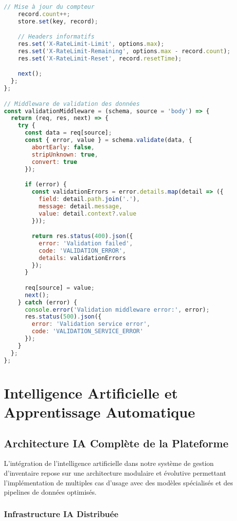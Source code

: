 \documentclass[12pt,a4paper]{report}
\begin{document}
\begin{lstlisting}[language=JavaScript, caption=Middleware de sécurité complet]
    // Mise à jour du compteur
    record.count++;
    store.set(key, record);

    // Headers informatifs
    res.set('X-RateLimit-Limit', options.max);
    res.set('X-RateLimit-Remaining', options.max - record.count);
    res.set('X-RateLimit-Reset', record.resetTime);

    next();
  };
};

// Middleware de validation des données
const validationMiddleware = (schema, source = 'body') => {
  return (req, res, next) => {
    try {
      const data = req[source];
      const { error, value } = schema.validate(data, {
        abortEarly: false,
        stripUnknown: true,
        convert: true
      });

      if (error) {
        const validationErrors = error.details.map(detail => ({
          field: detail.path.join('.'),
          message: detail.message,
          value: detail.context?.value
        }));

        return res.status(400).json({
          error: 'Validation failed',
          code: 'VALIDATION_ERROR',
          details: validationErrors
        });
      }

      req[source] = value;
      next();
    } catch (error) {
      console.error('Validation middleware error:', error);
      res.status(500).json({
        error: 'Validation service error',
        code: 'VALIDATION_SERVICE_ERROR'
      });
    }
  };
};
\end{lstlisting}

\chapter{Intelligence Artificielle et Apprentissage Automatique}

\section{Architecture IA Complète de la Plateforme}

L'intégration de l'intelligence artificielle dans notre système de gestion d'inventaire repose sur une architecture modulaire et évolutive permettant l'implémentation de multiples cas d'usage avec des modèles spécialisés et des pipelines de données optimisés.

\subsection{Infrastructure IA Distribuée}
\end{document}
